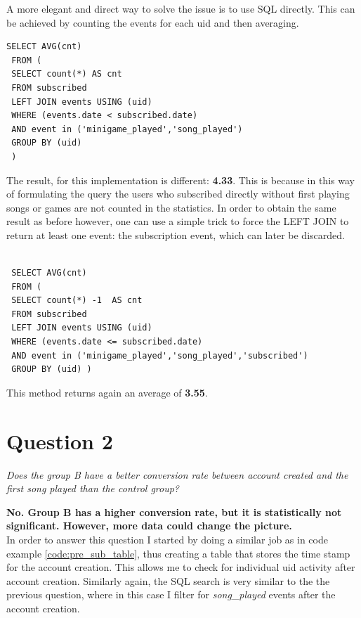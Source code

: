 \documentclass[paper=a4, fontsize=10pt]{report}
\begin{document}
A more elegant and direct way to solve the issue is to use SQL directly. This can be achieved by
counting the events for each uid and then averaging.

\footnotesize
\begin{lstlisting}[frame=single,caption=Return SQL average \label{code:sql_average_table}]
 SELECT AVG(cnt)
 FROM (  
 SELECT count(*) AS cnt
 FROM subscribed 
 LEFT JOIN events USING (uid)
 WHERE (events.date < subscribed.date)
 AND event in ('minigame_played','song_played') 
 GROUP BY (uid)
 )
\end{lstlisting}
\normalsize

The result, for this implementation is different: \textbf{4.33}. This is because in this way of
formulating the query the users who subscribed directly without first playing songs or 
games are not counted in the statistics. In order to obtain the same result as before however, 
one can use a simple trick to force the LEFT JOIN to return at least one event: the subscription event, which can 
later be discarded.

\footnotesize
\begin{lstlisting}[frame=single,caption=Return SQL average - Fixed \label{code:sql_average_fixed_table}]

 SELECT AVG(cnt)
 FROM ( 
 SELECT count(*) -1  AS cnt
 FROM subscribed 
 LEFT JOIN events USING (uid)
 WHERE (events.date <= subscribed.date)
 AND event in ('minigame_played','song_played','subscribed') 
 GROUP BY (uid) )
\end{lstlisting}
\normalsize
This method returns again an average of \textbf{3.55}.


\section*{Question 2}

\textit{Does the group B have a better conversion rate between account created and the first song played than the control group?}

\textbf{No. Group B has a higher conversion rate, but it is statistically not significant. However, more data could
change the picture.}\\

In order to answer this question I started by doing a similar job as in code example \ref{code:pre_sub_table}, thus creating a table that stores the time stamp
for the account creation. This allows me to check for individual uid activity after account creation. Similarly again, the SQL search is very similar to the 
the previous question, where in this case I filter for \textit{song\_played} events after the account creation.
\end{document}
